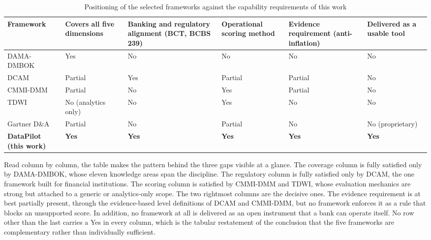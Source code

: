 \begin{table}[H]
\centering
\caption{Positioning of the selected frameworks against the capability requirements of this work} \label{tab:framework-positioning}

{\footnotesize
\setlength{\tabcolsep}{4pt}
\begin{tabular}{|p{3.1cm}|p{2.1cm}|p{2.3cm}|p{2.1cm}|p{2.2cm}|p{2.0cm}|}
\hline
\textbf{Framework} & \textbf{Covers all five dimensions} & \textbf{Banking and regulatory alignment (BCT, BCBS 239)} & \textbf{Operational scoring method} & \textbf{Evidence requirement (anti-inflation)} & \textbf{Delivered as a usable tool} \\
\hline
DAMA-DMBOK & Yes & No & No & No & No \\
\hline
DCAM & Partial & Yes & Partial & Partial & No \\
\hline
CMMI-DMM & Partial & No & Yes & Partial & No \\
\hline
TDWI & No (analytics only) & No & Yes & No & No \\
\hline
Gartner D\&A & Partial & No & Partial & No & No (proprietary) \\
\hline
\textbf{DataPilot (this work)} & \textbf{Yes} & \textbf{Yes} & \textbf{Yes} & \textbf{Yes} & \textbf{Yes} \\
\hline
\end{tabular}
}

\end{table}

Read column by column, the table makes the pattern behind the three gaps visible at a glance. The coverage column is fully satisfied only by DAMA-DMBOK, whose eleven knowledge areas span the discipline. The regulatory column is fully satisfied only by DCAM, the one framework built for financial institutions. The scoring column is satisfied by CMMI-DMM and TDWI, whose evaluation mechanics are strong but attached to a generic or analytics-only scope. The two rightmost columns are the decisive ones. The evidence requirement is at best partially present, through the evidence-based level definitions of DCAM and CMMI-DMM, but no framework enforces it as a rule that blocks an unsupported score. In addition, no framework at all is delivered as an open instrument that a bank can operate itself. No row other than the last carries a Yes in every column, which is the tabular restatement of the conclusion that the five frameworks are complementary rather than individually sufficient.

